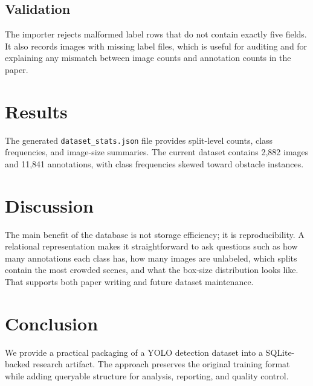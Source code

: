 \documentclass[11pt]{article}
\begin{document}
\subsection{Validation}
The importer rejects malformed label rows that do not contain exactly five fields. It also records images with missing label files, which is useful for auditing and for explaining any mismatch between image counts and annotation counts in the paper.

\section{Results}
The generated \texttt{dataset\_stats.json} file provides split-level counts, class frequencies, and image-size summaries. The current dataset contains 2,882 images and 11,841 annotations, with class frequencies skewed toward obstacle instances.

\section{Discussion}
The main benefit of the database is not storage efficiency; it is reproducibility. A relational representation makes it straightforward to ask questions such as how many annotations each class has, how many images are unlabeled, which splits contain the most crowded scenes, and what the box-size distribution looks like. That supports both paper writing and future dataset maintenance.

\section{Conclusion}
We provide a practical packaging of a YOLO detection dataset into a SQLite-backed research artifact. The approach preserves the original training format while adding queryable structure for analysis, reporting, and quality control.
\end{document}
